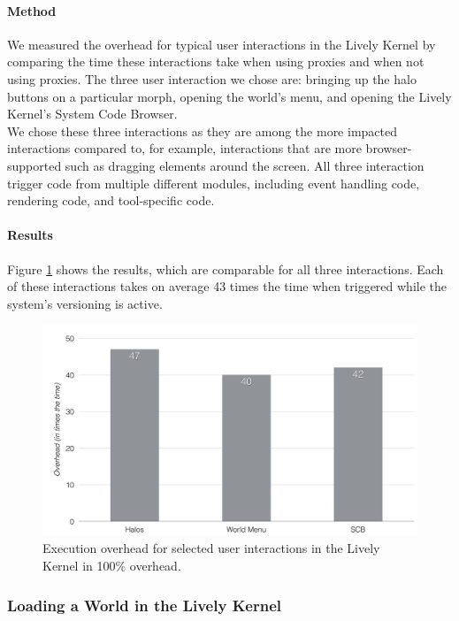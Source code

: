 \paragraph{Method}
We measured the overhead for typical user interactions in the Lively Kernel by comparing the time these interactions take when using proxies and when not using proxies.
The three user interaction we chose are: bringing up the halo buttons on a particular morph, opening the world's menu, and opening the Lively Kernel's System Code Browser.\\
We chose these three interactions as they are among the more impacted interactions compared to, for example, interactions that are more browser-supported such as dragging elements around the screen.
All three interaction trigger code from multiple different modules, including event handling code, rendering code, and tool-specific code.

\paragraph{Results}
Figure \ref{fig:LivelyInteractionsOverhead} shows the results, which are comparable for all three interactions.
Each of these interactions takes on average 43 times the time when triggered while the system's versioning is active.

\begin{figure}[h]
    \centering
    \includegraphics[width=\textwidth]{figures/6_evaluation/4_LivelyInteractionsOverhead.pdf}
    \caption{Execution overhead for selected user interactions in the Lively Kernel in 100\% overhead.}
    \label{fig:LivelyInteractionsOverhead}
\end{figure}


\subsubsection{Loading a World in the Lively Kernel}

